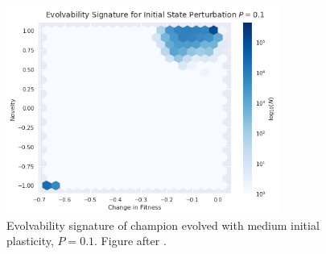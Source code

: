 \begin{figure}
    \centering
    \includegraphics[width=0.8\textwidth]{img/es_p0_1}
 	\captionsetup{singlelinecheck=off,justification=raggedright}
  	\caption{Evolvability signature of champion evolved with medium initial plasticity, $P=0.1$. Figure after \cite{Tarapore2015EvolvabilityBenchmarks}.}
    \label{fig:es_p0_1}
\end{figure}